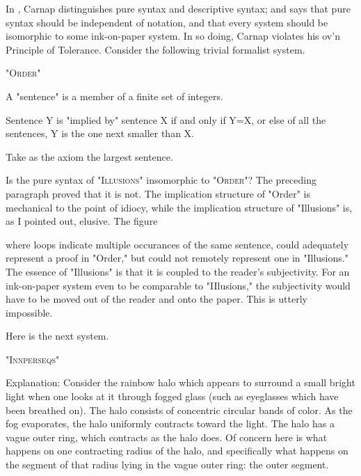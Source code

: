 \documentclass[10pt,twoside]{memoir}
\begin{document}
\begin{enumerate}
{\begin{enumerate}
\begin{sysrules}
\begin{sysrules}
In , Carnap distinguishes pure syntax 
and descriptive syntax; and says that pure syntax should be independent of 
notation, and that every system should be isomorphic to some ink-on-paper 
system. In so doing, Carnap violates his ov'n Principle of Tolerance. Consider 
the following trivial formalist system. 

{ \centering \large "\textsc{Order}" \par}

\begin{sysrules}
A "sentence" is a member of a finite set of integers. 

Sentence Y is "implied by" sentence X if and only if Y=X, or else of all the 
sentences, Y is the one next smaller than X. 

Take as the axiom the largest sentence. 
\end{sysrules}


Is the pure syntax of "\textsc{Illusions}" insomorphic to "\textsc{Order}"? The preceding 
paragraph proved that it is not. The implication structure of "Order" is 
mechanical to the point of idiocy, while the implication structure of 
"Illusions" is, as I pointed out, elusive. The figure 




where loops indicate multiple occurances of the same sentence, could 
adequately represent a proof in "Order," but could not remotely represent 
one in "Illusions." The essence of "Illusions" is that it is coupled to the 
reader's subjectivity. For an ink-on-paper system even to be comparable to 
"IIlusions," the subjectivity would have to be moved out of the reader and 
onto the paper. This is utterly impossible. 

Here is the next system. 

{ \centering \large "\textsc{Innperseqs}" \par}

\begin{sysrules}
Explanation: Consider the rainbow halo which appears to surround a small 
bright light when one looks at it through fogged glass (such as 
eyeglasses which have been breathed on). The halo consists of 
concentric circular bands of color. As the fog evaporates, the halo 
uniformly contracts toward the light. The halo has a vague outer 
ring, which contracts as the halo does. Of concern here is what 
happens on one contracting radius of the halo, and specifically 
what happens on the segment of that radius lying in the vague 
outer ring: the outer segment. 


\end{sysrules}
\end{sysrules}
\end{sysrules}
\end{enumerate}}
\end{enumerate}
\end{document}
